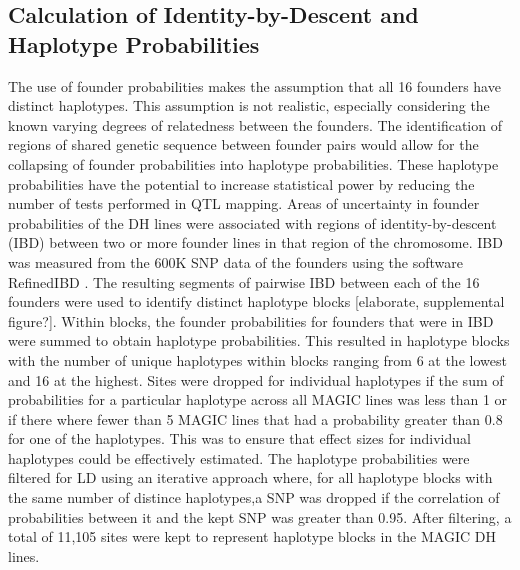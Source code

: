 \documentclass[article,9pt,twocolumn,twoside]{rilabRxiv}
\begin{document}
\subsection{Calculation of Identity-by-Descent and Haplotype Probabilities}
The use of founder probabilities makes the assumption that all 16 founders have distinct haplotypes. This assumption is not realistic, especially considering the known varying degrees of relatedness between the founders. The identification of regions of shared genetic sequence between founder pairs would allow for the collapsing of founder probabilities into haplotype probabilities. These haplotype probabilities have the potential to increase statistical power by reducing the number of tests performed in QTL mapping. Areas of uncertainty in founder probabilities of the DH lines were associated with regions of identity-by-descent (IBD) between two or more founder lines in that region of the chromosome. IBD was measured from the 600K SNP data of the founders using the software RefinedIBD \citep{Browning459}.
The resulting segments of pairwise IBD between each of the 16 founders were used to identify distinct haplotype blocks [elaborate, supplemental figure?]. Within blocks, the founder probabilities for founders that were in  IBD were summed to obtain haplotype probabilities. This resulted in haplotype blocks with the number of unique haplotypes within blocks ranging from 6 at the lowest and 16 at the highest. Sites were dropped for individual haplotypes if the sum of probabilities for a particular haplotype across all MAGIC lines was less than 1 or if there where fewer than 5 MAGIC lines that had a probability greater than 0.8 for one of the haplotypes. This was to ensure that effect sizes for individual haplotypes could be effectively estimated. The haplotype probabilities were filtered for LD using an iterative approach where, for all haplotype blocks with the same number of distince haplotypes,a SNP was dropped if the correlation of probabilities between it and the kept SNP was greater than 0.95. After filtering, a total of 11,105 sites were kept to represent haplotype blocks in the MAGIC DH lines.

\end{document}
